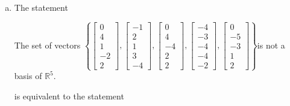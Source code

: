 \begin{exerciseAnswer}
\begin{enumerate}[(a)]
\item The statement 
\begin{center}\begin{minipage}{0.8\textwidth}
 The set of vectors \( \left\{ \left[\begin{array}{c}
0 \\
4 \\
1 \\
-2 \\
2
\end{array}\right] , \left[\begin{array}{c}
-1 \\
2 \\
1 \\
3 \\
-4
\end{array}\right] , \left[\begin{array}{c}
0 \\
4 \\
-4 \\
2 \\
2
\end{array}\right] , \left[\begin{array}{c}
-4 \\
-3 \\
-4 \\
-4 \\
-2
\end{array}\right] , \left[\begin{array}{c}
0 \\
-5 \\
-3 \\
1 \\
2
\end{array}\right] \right\} \)is not a basis of \(\mathbb{R}^5\). 
\end{minipage}\end{center}
     is equivalent to the statement 
\begin{center}\begin{minipage}{0.8\textwidth}
 The set of vectors \( \left\{ \left[\begin{array}{c}
0 \\
4 \\
1 \\
-2 \\
2
\end{array}\right] , \left[\begin{array}{c}
-1 \\
2 \\

\end{array}
\end{minipage}
\end{center}
\end{enumerate}
\end{exerciseAnswer}
